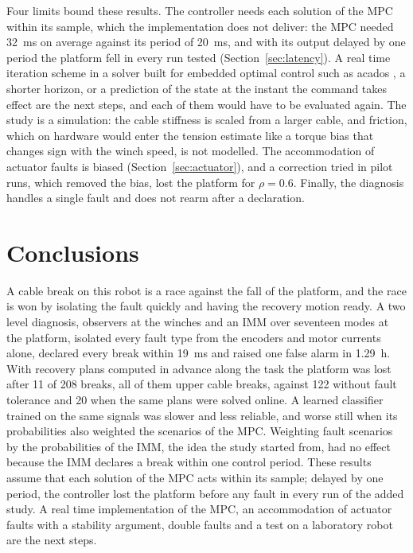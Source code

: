 \documentclass{interact}
\begin{document}
Four limits bound these results. The controller needs each solution of the MPC within its sample, which the implementation does not deliver: the MPC needed 32~ms on average against its period of 20~ms, and with its output delayed by one period the platform fell in every run tested (Section~\ref{sec:latency}). A real time iteration scheme \citep{diehl2005rti} in a solver built for embedded optimal control such as acados \citep{verschueren2022acados}, a shorter horizon, or a prediction of the state at the instant the command takes effect are the next steps, and each of them would have to be evaluated again. The study is a simulation: the cable stiffness is scaled from a larger cable, and friction, which on hardware would enter the tension estimate like a torque bias that changes sign with the winch speed, is not modelled. The accommodation of actuator faults is biased (Section~\ref{sec:actuator}), and a correction tried in pilot runs, which removed the bias, lost the platform for $\rho=0.6$. Finally, the diagnosis handles a single fault and does not rearm after a declaration.

\section{Conclusions}\label{sec:conclusions}

A cable break on this robot is a race against the fall of the platform, and the race is won by isolating the fault quickly and having the recovery motion ready. A two level diagnosis, observers at the winches and an IMM over seventeen modes at the platform, isolated every fault type from the encoders and motor currents alone, declared every break within 19~ms and raised one false alarm in 1.29~h. With recovery plans computed in advance along the task the platform was lost after 11 of 208 breaks, all of them upper cable breaks, against 122 without fault tolerance and 20 when the same plans were solved online. A learned classifier trained on the same signals was slower and less reliable, and worse still when its probabilities also weighted the scenarios of the MPC. Weighting fault scenarios by the probabilities of the IMM, the idea the study started from, had no effect because the IMM declares a break within one control period. These results assume that each solution of the MPC acts within its sample; delayed by one period, the controller lost the platform before any fault in every run of the added study. A real time implementation of the MPC, an accommodation of actuator faults with a stability argument, double faults and a test on a laboratory robot are the next steps.
\end{document}

